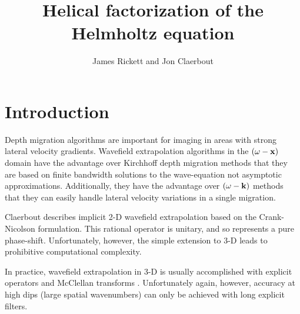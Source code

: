 \def\figdir{./Fig} 

\title{Helical factorization of the {H}elmholtz equation}

\author{James Rickett and Jon Claerbout}


\section{Introduction}
Depth migration algorithms are important for imaging in areas with
strong lateral velocity gradients. Wavefield extrapolation algorithms
in the $(\omega-{\bf x})$ domain have the advantage over Kirchhoff depth
migration methods that they are based on finite bandwidth solutions to
the wave-equation not asymptotic approximations. Additionally, they
have the advantage over $(\omega-{\bf k})$ methods that they can easily
handle lateral velocity variations in a single migration.

\par
Claerbout  describes implicit 2-D wavefield
extrapolation based on the Crank-Nicolson formulation.  This rational
operator is unitary, and so represents a pure
phase-shift. Unfortunately, however, the simple extension to 3-D leads
to prohibitive computational complexity. 

\par
In practice, wavefield extrapolation in 3-D is usually accomplished
with explicit operators and McClellan transforms
\cite{hale90b,hale90a}. Unfortunately again, 
however, accuracy at high dips (large spatial wavenumbers) can only be
achieved with long explicit filters.

